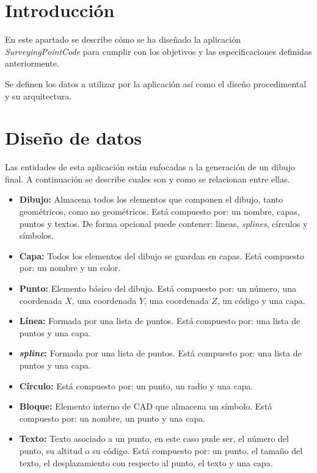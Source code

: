 
\section{Introducción}
En este apartado se describe cómo se ha diseñado la aplicación \emph{SurveyingPointCode} para cumplir con los objetivos y las especificaciones definidas anteriormente.

Se definen los datos a utilizar por la aplicación así como el diseño procedimental y su arquitectura.
\section{Diseño de datos}

Las entidades de esta aplicación están enfocadas a la generación de un dibujo final. A continuación se describe cuales son y como se relacionan entre ellas. 


\begin{itemize}

\item \textbf{Dibujo:} Almacena todos los elementos que componen el dibujo, tanto geométricos, como no geométricos. Está compuesto por: un nombre, capas, puntos y textos. De forma opcional puede contener: lineas, \emph{splines}, círculos y símbolos.

\item \textbf{Capa:} Todos los elementos del dibujo se guardan en capas. Está compuesto por: un nombre y un color.

\item \textbf{Punto:} Elemento básico del dibujo. Está compuesto por: un número, una coordenada $X$, una coordenada $Y\!$, una coordenada $Z$, un código y una capa.

\item \textbf{Línea:} Formada por una lista de puntos. Está compuesto por: una lista de puntos y una capa.

\item \textbf{\emph{spline}:} Formada por una lista de puntos. Está compuesto por: una lista de puntos y una capa.

\item \textbf{Círculo:} Está compuesto por: un punto, un radio y una capa.

\item \textbf{Bloque:} Elemento interno de CAD que almacena un símbolo. Está compuesto por: un nombre, un punto y una capa.

\item \textbf{Texto:} Texto asociado a un punto, en este caso pude ser, el número del punto, su altitud o su código. Está compuesto por: un punto, el tamaño del texto, el desplazamiento con respecto al punto, el texto y una capa.

\end{itemize}

